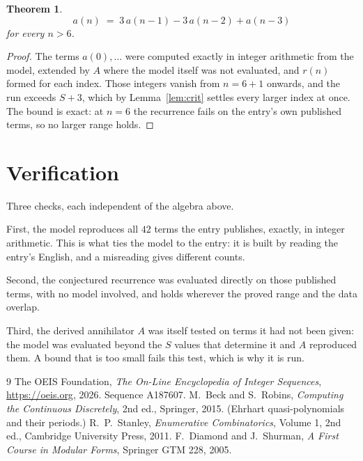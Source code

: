 \documentclass[11pt,a4paper]{article}
\theoremstyle{plain}
\newtheorem{theorem}{Theorem}
\theoremstyle{definition}
\begin{document}
\begin{theorem}
\[
a(n)\;=\;3\,a(n-1) - 3\,a(n-2) + a(n-3)
\]
for every $n>6$.
\end{theorem}

\begin{proof}
The terms $a(0),\dots$ were computed exactly in integer arithmetic from the model, extended by
$A$ where the model itself was not evaluated, and $r(n)$ formed for each index. Those integers
vanish from $n=6+1$ onwards, and the run exceeds $S+3$, which by
Lemma~\ref{lem:crit} settles every larger index at once. The bound is exact: at $n=6$ the recurrence fails on the entry's own published terms, so no larger range holds.
\end{proof}

\section{Verification}

Three checks, each independent of the algebra above.

First, the model reproduces all $42$ terms the entry publishes, exactly, in integer
arithmetic. This is what ties the model to the entry: it is built by reading the entry's
English, and a misreading gives different counts.

Second, the conjectured recurrence was evaluated directly on those published terms, with no
model involved, and holds wherever the proved range and the data overlap.

Third, the derived annihilator $A$ was itself tested on terms it had not been given: the model
was evaluated beyond the $S$ values that determine it and $A$ reproduced them. A bound that is
too small fails this test, which is why it is run.

\begin{thebibliography}{9}
 The OEIS Foundation, \emph{The On-Line Encyclopedia of Integer
Sequences}, \url{https://oeis.org}, 2026. Sequence A187607.
 M.~Beck and S.~Robins, \emph{Computing the Continuous Discretely},
2nd ed., Springer, 2015. (Ehrhart quasi-polynomials and their periods.)
 R.~P.~Stanley, \emph{Enumerative Combinatorics}, Volume 1, 2nd ed.,
Cambridge University Press, 2011.
 F.~Diamond and J.~Shurman, \emph{A First Course in Modular Forms},
Springer GTM 228, 2005.
\end{thebibliography}
\end{document}
